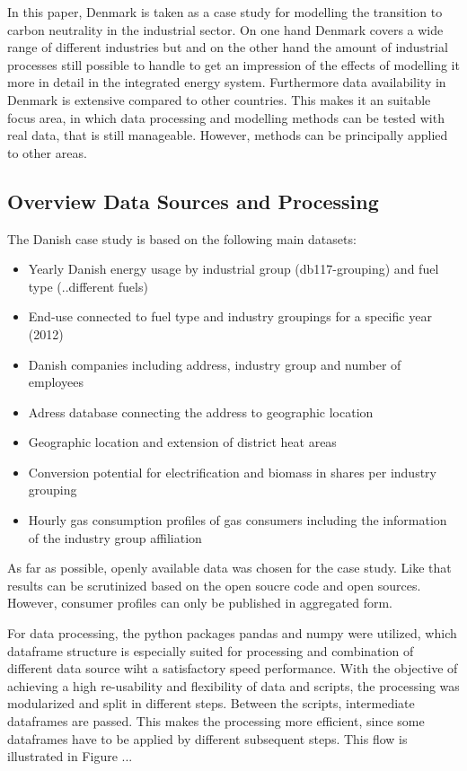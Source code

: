 \documentclass[review]{elsarticle}
\begin{document}

In this paper, Denmark is taken as a case study for modelling the transition to carbon neutrality in the industrial sector. On one hand Denmark covers a wide range of different industries but  and on the other hand the amount of industrial processes still possible to handle to get an impression of the effects of modelling it more in detail in the integrated energy system. Furthermore data availability in Denmark is extensive compared to other countries. This makes it an suitable focus area, in which data processing and modelling methods can be tested with real data, that is still manageable. However, methods can be principally applied to other areas.

\subsection{Overview Data Sources and Processing}
The Danish case study is based on the following main datasets:
\begin{itemize}
 \item Yearly Danish energy usage by industrial group (db117-grouping) and fuel type (..different fuels)
 \item End-use connected to fuel type and industry groupings for a specific year (2012) 
 \item Danish companies including address, industry group and number of employees
 \item Adress database connecting the address to geographic location
 \item Geographic location and extension of district heat areas
 \item Conversion potential for electrification and biomass in shares per industry grouping
 \item Hourly gas consumption profiles of gas consumers including the information of the industry group affiliation
\end{itemize}

As far as possible, openly available data was chosen for the case study. Like that results can be scrutinized based on the open soucre code and open sources. However, consumer profiles can only be published in aggregated form.

For data processing, the python packages pandas and numpy were utilized, which dataframe structure is especially suited for processing and combination of different data source wiht a satisfactory speed performance. With the objective of achieving a high re-usability and flexibility of data and scripts, the processing was modularized and split in different steps. Between the scripts, intermediate dataframes are passed. This makes the processing more efficient, since some dataframes have to be applied by different subsequent steps. This flow is illustrated in Figure ...  
\end{document}
